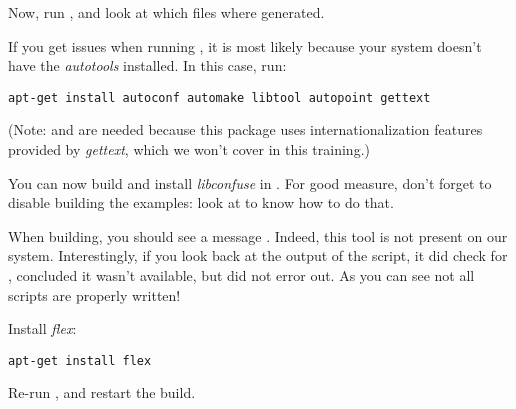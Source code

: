 Now, run , and look at which files where
generated.

If you get issues when running , it is most likely
because your system doesn't have the {\em autotools} installed. In
this case, run:

\begin{verbatim}
apt-get install autoconf automake libtool autopoint gettext
\end{verbatim}

(Note:  and  are needed because this
package uses internationalization features provided by {\em gettext},
which we won't cover in this training.)

You can now build and install {\em libconfuse} in
. For good measure, don't forget to disable building
the examples: look at  to know how to do
that.

When building, you should see a message . Indeed, this tool is not present on our
system. Interestingly, if you look back at the output of the
 script, it did check for , concluded it
wasn't available, but did not error out. As you can see not all
 scripts are properly written!

Install {\em flex}:

\begin{verbatim}
apt-get install flex
\end{verbatim}

Re-run , and restart the build.

